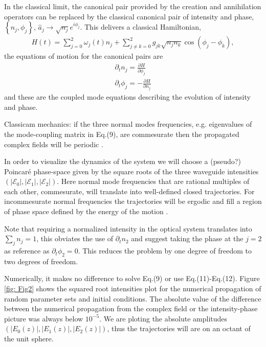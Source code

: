 \documentclass[9pt,twocolumn,twoside]{osajnl}
\begin{document}
In the classical limit, the canonical pair provided by the creation and annihilation operators can be replaced by the classical canonical pair of intensity and phase, $\left\{ n_{j}, \phi_{j} \right\}$, $ \hat{a}_{j} \rightarrow \sqrt{n_{j}}e^{i \phi_{j}}$. 
This delivers a classical Hamiltonian, 
\begin{eqnarray}
H(t) = \sum_{j=0}^{2} \omega_{j}(t) n_{j}  
	+ \sum_{j \neq k = 0}^{2} g_{jk} \sqrt{n_{j} n_{k}} \cos \left( \phi_{j} - \phi_{k} \right),
\end{eqnarray}
the equations of motion for the canonical pairs are 
\begin{eqnarray}
\partial_t n_j = \frac{\partial H}{\partial \phi_j}\\
\partial_t \phi_j = - \frac{\partial H}{\partial n_j}  
\end{eqnarray}
and these are the coupled mode equations describing the evolution of intensity and phase.

Classicam mechanics: if the three normal modes frequencies, e.g. eigenvalues of the mode-coupling matrix in Eq.(9), are commesurate then the propagated complex fields will be periodic \cite{Goldstein1980}. 

In order to visualize the dynamics of the system we will choose a (pseudo?) Poincar\'e phase-space given by the square roots of the three waveguide intensities $(\vert \mathcal{E}_{0} \vert,\vert \mathcal{E}_{1} \vert,\vert \mathcal{E}_{2} \vert )$.
Here  normal mode frequencies that are rational multiples of each other, commesurate, will translate into well-defined closed trajectories. For incommesurate normal frequencies the trajectories will be ergodic and fill a region of phase space defined by the energy of the motion \cite{Goldstein1980}.


Note that requiring a normalized intensity in the optical system translates into $\sum_{j} n_{j} = 1$, this obviates the use of $\partial_{t} n_{2}$ and suggest taking the phase at the $j=2$ as reference as $\partial_{t} \phi_{2} = 0$. This reduces the problem by one degree of freedom to two degrees of freedom.

Numerically, it makes no difference to solve Eq.(9) or use Eq.(11)-Eq.(12).
Figure \ref{fig: Fig2} shows the squared root intensities plot for the numerical propagation of random parameter sets and initial conditions. The absolute value of the difference between the numerical propagation from the complex field or the intensity-phase picture was always below $10^{-5}$.
We are ploting the absolute amplitudes $(\vert E_{0}(z) \vert, \vert E_{1}(z) \vert, \vert E_{2}(z) \vert )$, thus the trajectories will are on an octant of the unit sphere.
\end{document}
